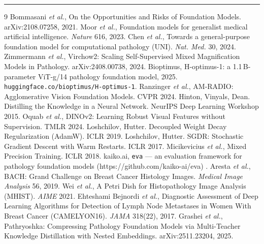\documentclass[10pt]{article}
\begin{document}
\vspace{2pt}\hrule\vspace{2pt}
{\footnotesize
\begin{thebibliography}{9}
\setlength{\itemsep}{0pt}
 Bommasani \emph{et al.}, On the Opportunities and Risks of Foundation Models. arXiv:2108.07258, 2021.
 Moor \emph{et al.}, Foundation models for generalist medical artificial intelligence. \emph{Nature} 616, 2023.
 Chen \emph{et al.}, Towards a general-purpose foundation model for computational pathology (UNI). \emph{Nat. Med.} 30, 2024.
 Zimmermann \emph{et al.}, Virchow2: Scaling Self-Supervised Mixed Magnification Models in Pathology. arXiv:2408.00738, 2024.
 Bioptimus, H-optimus-1: a 1.1\,B-parameter ViT-g/14 pathology foundation model, 2025. \texttt{huggingface.co/bioptimus/H-optimus-1}.
 Ranzinger \emph{et al.}, AM-RADIO: Agglomerative Vision Foundation Models. CVPR 2024.
 Hinton, Vinyals, Dean. Distilling the Knowledge in a Neural Network. NeurIPS Deep Learning Workshop 2015.
 Oquab \emph{et al.}, DINOv2: Learning Robust Visual Features without Supervision. TMLR 2024.
 Loshchilov, Hutter. Decoupled Weight Decay Regularization (AdamW). ICLR 2019.
 Loshchilov, Hutter. SGDR: Stochastic Gradient Descent with Warm Restarts. ICLR 2017.
 Micikevicius \emph{et al.}, Mixed Precision Training. ICLR 2018.
 kaiko.ai, \texttt{eva} — an evaluation framework for pathology foundation models (https://github.com/kaiko-ai/eva) .
 Aresta \emph{et al.}, BACH: Grand Challenge on Breast Cancer Histology Images. \emph{Medical Image Analysis} 56, 2019.
 Wei \emph{et al.}, A Petri Dish for Histopathology Image Analysis (MHIST). \emph{AIME} 2021.
 Ehteshami Bejnordi \emph{et al.}, Diagnostic Assessment of Deep Learning Algorithms for Detection of Lymph Node Metastases in Women With Breast Cancer (CAMELYON16). \emph{JAMA} 318(22), 2017.
 Grashei \emph{et al.}, Pathryoshka: Compressing Pathology Foundation Models via Multi-Teacher Knowledge Distillation with Nested Embeddings. arXiv:2511.23204, 2025.
\end{thebibliography}}
\end{document}
